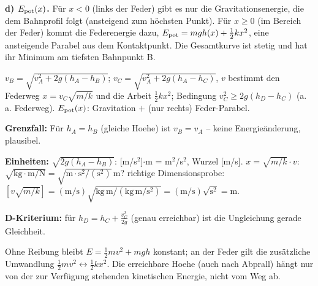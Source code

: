 \textbf{d) $E_{\rm pot}(x)$.} Für $x<0$ (links der Feder) gibt es nur die
Gravitationsenergie, die dem Bahnprofil folgt (ansteigend zum
höchsten Punkt). Für $x\ge0$ (im Bereich der Feder) kommt die
Federenergie dazu,
$E_{\rm pot}=mgh(x)+\tfrac12 kx^2$, eine ansteigende
Parabel aus dem Kontaktpunkt. Die Gesamtkurve ist stetig und hat ihr
Minimum am tiefsten Bahnpunkt B.

\begin{ergebnis}
$v_B=\sqrt{v_A^2+2g(h_A-h_B)}$; $v_C=\sqrt{v_A^2+2g(h_A-h_C)}$,
$v$ bestimmt den Federweg $x=v_C\sqrt{m/k}$ und die Arbeit
$\tfrac12kx^2$; Bedingung $v_C^2\ge2g(h_D-h_C)$ (a. a. Federweg).
$E_{\rm pot}(x)$: Gravitation $+$ (nur rechts) Feder-Parabel.
\end{ergebnis}

\begin{kontrolle}
\textbf{Grenzfall:} Für $h_A=h_B$ (gleiche Hoehe) ist $v_B=v_A$ -- keine
Energieänderung, plausibel. \checkmark

\textbf{Einheiten:} $\sqrt{2g(h_A-h_B)}$: [m/s$^2$]$\cdot$m = m$^2$/s$^2$,
Wurzel [m/s]. $x=\sqrt{m/k}\cdot v$: $\sqrt{\mathrm{kg}\cdot\mathrm{m/N}}=\sqrt{\mathrm{m\cdot s^2/(s^2)}}\,$m? richtige Dimensionsprobe:
$[v\sqrt{m/k}]=(\mathrm{m/s})\sqrt{\mathrm{kg\,m/(kg\,m/s^2)}}=
(\mathrm{m/s})\sqrt{\mathrm{s^2}}=\mathrm m$. \checkmark

\textbf{D-Kriterium:} für $h_D=h_C+\tfrac{v_C^2}{2g}$ (genau erreichbar)
ist die Ungleichung gerade Gleichheit. \checkmark
\end{kontrolle}

\begin{merksatz}
Ohne Reibung bleibt $E=\tfrac12mv^2+mgh$ konstant; an der Feder gilt die
zusätzliche Umwandlung $\tfrac12mv^2\leftrightarrow\tfrac12kx^2$. Die
erreichbare Hoehe (auch nach Abprall) hängt nur von der zur Verfügung
stehenden kinetischen Energie, nicht vom Weg ab.
\end{merksatz}
